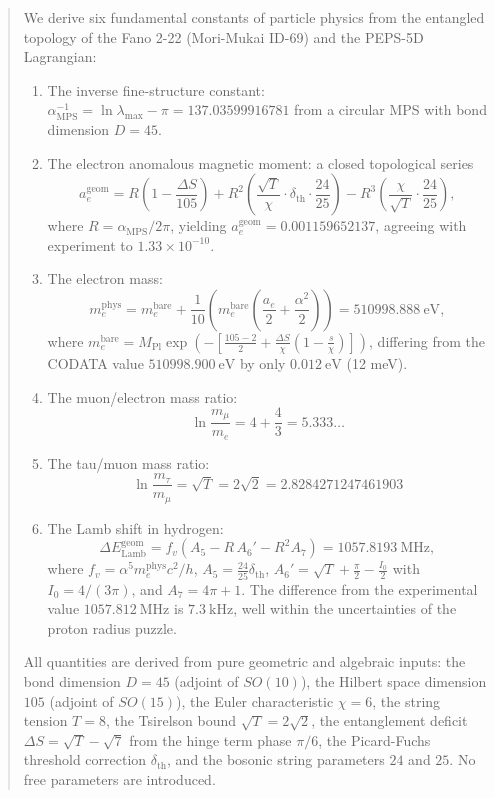 \documentclass[12pt]{article}
\begin{document}
\begin{abstract}
We derive six fundamental constants of particle physics from the entangled topology of the Fano 2-22 (Mori-Mukai ID-69) and the PEPS-5D Lagrangian:

\begin{enumerate}
  \item The inverse fine-structure constant: \(\alpha_{\text{MPS}}^{-1} = \ln\lambda_{\max} - \pi = 137.03599916781\) from a circular MPS with bond dimension \(D=45\).
  \item The electron anomalous magnetic moment: a closed topological series
    \[
    a_e^{\text{geom}} = R\left(1 - \frac{\Delta S}{105}\right) + R^2\left(\frac{\sqrt{T}}{\chi} \cdot \delta_{\text{th}} \cdot \frac{24}{25}\right) - R^3\left(\frac{\chi}{\sqrt{T}} \cdot \frac{24}{25}\right),
    \]
    where \(R = \alpha_{\text{MPS}}/2\pi\), yielding \(a_e^{\text{geom}} = 0.001159652137\), agreeing with experiment to \(1.33\times10^{-10}\).
  \item The electron mass:
    \[
    m_e^{\text{phys}} = m_e^{\text{bare}} + \frac{1}{10}\left(m_e^{\text{bare}}\left(\frac{a_e}{2} + \frac{\alpha^2}{2}\right)\right) = 510998.888\ \text{eV},
    \]
    where \(m_e^{\text{bare}} = M_{\text{Pl}} \exp\left(-\left[\frac{105-2}{2} + \frac{\Delta S}{\chi}\left(1 - \frac{s}{\chi}\right)\right]\right)\), differing from the CODATA value \(510998.900\ \text{eV}\) by only \(0.012\ \text{eV}\) (12 meV).
  \item The muon/electron mass ratio:
    \[
    \ln\frac{m_\mu}{m_e} = 4 + \frac{4}{3} = 5.333\ldots
    \]
  \item The tau/muon mass ratio:
    \[
    \ln\frac{m_\tau}{m_\mu} = \sqrt{T} = 2\sqrt{2} = 2.8284271247461903
    \]
  \item The Lamb shift in hydrogen:
    \[
    \Delta E_{\text{Lamb}}^{\text{geom}} = f_v\left(A_5 - R\,A_6' - R^2 A_7\right) = 1057.8193\ \text{MHz},
    \]
    where \(f_v = \alpha^5 m_e^{\text{phys}}c^2/h\), \(A_5 = \frac{24}{25}\delta_{\text{th}}\), \(A_6' = \sqrt{T} + \frac{\pi}{2} - \frac{I_0}{2}\) with \(I_0 = 4/(3\pi)\), and \(A_7 = 4\pi + 1\). The difference from the experimental value \(1057.812\ \text{MHz}\) is \(7.3\ \text{kHz}\), well within the uncertainties of the proton radius puzzle.
\end{enumerate}

All quantities are derived from pure geometric and algebraic inputs: the bond dimension \(D=45\) (adjoint of \(SO(10)\)), the Hilbert space dimension \(105\) (adjoint of \(SO(15)\)), the Euler characteristic \(\chi=6\), the string tension \(T=8\), the Tsirelson bound \(\sqrt{T}=2\sqrt{2}\), the entanglement deficit \(\Delta S = \sqrt{T} - \sqrt{7}\) from the hinge term phase \(\pi/6\), the Picard-Fuchs threshold correction \(\delta_{\text{th}}\), and the bosonic string parameters \(24\) and \(25\). No free parameters are introduced.


\end{abstract}
\end{document}
